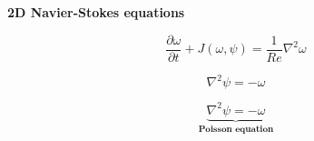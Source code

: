 \documentclass[aspectratio=169]{beamer}
\begin{document}
\begin{frame}
  \begin{minipage}{.68\textwidth}
    \centering
    \textbf{2D Navier-Stokes equations}

    \medskip

    \begin{overprint}
      \large
      \[
      \dfrac{\partial \omega}{\partial t} + J(\omega, \psi) = \dfrac{1}{Re} \nabla^2 \omega
      \]

      \large
      \[
      \nabla^2 \psi = - \omega
      \]

      \large
      \[
      \underbrace{\nabla^2 \psi = - \omega}_{\textbf{Poisson equation}}
      \]
    \end{overprint}
  \end{minipage}%
  \hfill
  \begin{minipage}{.28\textwidth}
  \end{minipage}
  \vspace{-1cm}
\end{frame}
\end{document}
